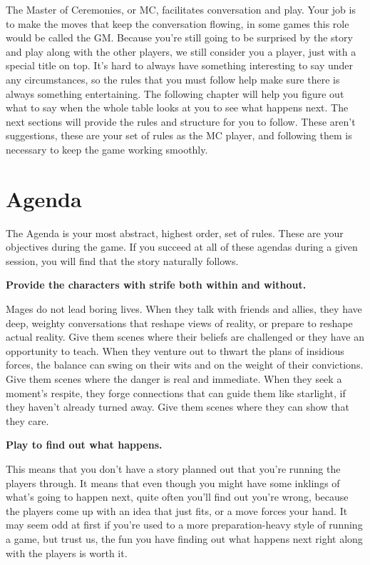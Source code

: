 \documentclass[
  oneside,
  statementpaper,
  9pt]{memoir}
\begin{document}
\begin{MC}

The Master of Ceremonies, or MC, facilitates conversation and play. Your job is to make the moves that keep the conversation flowing, in some games this role would be called the GM. Because you're still going to be surprised by the story and play along with the other players, we still consider you a player, just with a special title on top. It’s hard to always have something interesting to say under any circumstances, so the rules that you must follow help make sure there is always something entertaining. The following chapter will help you figure out what to say when the whole table looks at you to see what happens next. The next sections will provide the rules and structure for you to follow. These aren’t suggestions, these are your set of rules as the MC player, and following them is necessary to keep the game working smoothly.

\end{MC}

\hypertarget{agenda}{%
\section{Agenda}\label{agenda}}

The Agenda is your most abstract, highest order, set of rules. These are
your objectives during the game. If you succeed at all of these agendas
during a given session, you will find that the story naturally follows.

\textbf{Provide the characters with strife both within and without.}

Mages do not lead boring lives. When they talk with friends and allies,
they have deep, weighty conversations that reshape views of reality, or
prepare to reshape actual reality. Give them scenes where their beliefs
are challenged or they have an opportunity to teach. When they venture
out to thwart the plans of insidious forces, the balance can swing on
their wits and on the weight of their convictions. Give them scenes
where the danger is real and immediate. When they seek a moment's
respite, they forge connections that can guide them like starlight, if
they haven't already turned away. Give them scenes where they can show
that they care.

\textbf{Play to find out what happens.}

This means that you don't have a story planned out that you're running
the players through. It means that even though you might have some
inklings of what's going to happen next, quite often you'll find out
you're wrong, because the players come up with an idea that just fits,
or a move forces your hand. It may seem odd at first if you're used to a
more preparation-heavy style of running a game, but trust us, the fun
you have finding out what happens next right along with the players is
worth it.
\end{document}
